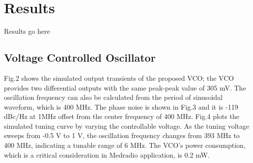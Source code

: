 \section{Results}
Results go here

\subsection{Voltage Controlled Oscillator}
Fig.2 shows the simulated output transients of the proposed VCO; the VCO provides two differential outputs with the same peak-peak value of 305 mV. The oscillation frequency can also be calculated from the period of sinusoidal waveform, which is 400 MHz. The phase noise is shown in Fig.3 and it is -119 dBc/Hz at 1MHz offset from the center frequency of 400 MHz. Fig.4 plots the simulated tuning curve by varying the controllable voltage. As the tuning voltage sweeps from -0.5 V to 1 V, the oscillation frequency changes from 393 MHz to 400 MHz, indicating a tunable range of 6 MHz. The VCO’s power consumption, which is a critical consideration in Medradio application, is 0.2 mW.